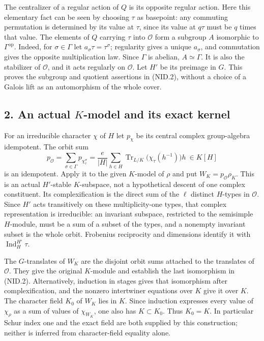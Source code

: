 The centralizer of a regular action of $Q$ is its opposite regular
action.  Here this elementary fact can be seen by choosing $\tau$ as
basepoint: any commuting permutation is determined by its value at
$\tau$, since its value at $q\tau$ must be $q$ times that value.
The elements of $Q$ carrying $\tau$ into $\mathcal O$ form a subgroup
$A$ isomorphic to $\Gamma^{\mathrm{op}}$.  Indeed, for $\sigma\in
\Gamma$ let $a_\sigma\tau=\tau^\sigma$; regularity gives a unique
$a_\sigma$, and commutation gives the opposite multiplication law.
Since $\Gamma$ is abelian, $A\simeq\Gamma$.
It is also the stabilizer of $\mathcal O$, and it acts regularly on
$\mathcal O$.  Let $H'$ be its preimage in $G$.  This proves the
subgroup and quotient assertions in (NID.2), without a choice of a
Galois lift as an automorphism of the whole cover.

\subsection*{2. An actual $K$-model and its exact kernel}

For an irreducible character $\chi$ of $H$ let $p_\chi$ be its
central complex group-algebra idempotent.  The orbit sum
\[
 p_{\mathcal O}=\sum_{\sigma\in\Gamma}p_{\chi_\tau^\sigma}
   =\frac{e}{|H|}\sum_{h\in H}
       \operatorname{Tr}_{L/K}\bigl(\chi_\tau(h^{-1})\bigr)h
       \ \in K[H]
 \tag{NID.9}
\]
is an idempotent.  Apply it to the given $K$-model of $\rho$ and put
$W_K=p_{\mathcal O}\rho_K$.  This is an actual $H'$-stable
$K$-subspace, not a hypothetical descent of one complex constituent.
Its complexification is the direct sum of the $\ell$ distinct
$H$-types in $\mathcal O$.  Since $H'$ acts transitively on these
multiplicity-one types, that complex representation is irreducible:
an invariant subspace, restricted to the semisimple $H$-module, must
be a sum of a subset of the types, and a nonempty invariant subset
is the whole orbit.  Frobenius reciprocity and dimensions identify it
with $\operatorname{Ind}_H^{H'}\tau$.

The $G$-translates of $W_K$ are the disjoint orbit sums attached to
the translates of $\mathcal O$.  They give the original $K$-module
and establish the last isomorphism in (NID.2).  Alternatively,
induction in stages gives that isomorphism after complexification,
and the nonzero intertwiner equations over $K$ give it over $K$.
The character field $K_0$ of $W_K$ lies in $K$.  Since induction
expresses every value of $\chi_\rho$ as a sum of values of
$\chi_{W_K}$, one also has $K\subset K_0$.  Thus $K_0=K$.
In particular Schur index one and the exact field are both supplied
by this construction; neither is inferred from character-field
equality alone.

